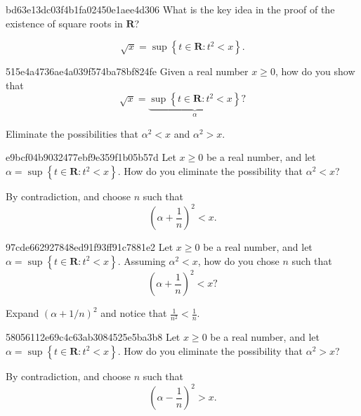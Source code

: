 \begin{note}{bd63e13dc03f4b1fa02450e1aee4d306}
    What is the key idea in the proof of the existence of square roots in \({ \mathbf{R} }\)?

    \begin{cloze}{1}
        \[
            \sqrt{x} = \sup \left\{ t \in \mathbf{R} : t^2 < x \right\}.
        \]
    \end{cloze}
\end{note}

\begin{note}{515e4a4736ae4a039f574ba78bf824fe}
    Given a real number \({ x \geq 0 }\), how do you show that
    \[
        \sqrt{x} = \underbrace{\sup \left\{ t \in \mathbf{R} : t^2 < x \right\}}_{\alpha}?
    \]

    \begin{cloze}{1}
        Eliminate the possibilities that \({ \alpha^2 < x }\) and \({ \alpha^2 > x }\).
    \end{cloze}
\end{note}

\begin{note}{e9bcf04b9032477ebf9e359f1b05b57d}
    Let \({ x \geq 0 }\) be a real number, and let \({ \alpha = \sup \left\{ t \in \mathbf{R} : t^2 < x \right\} }\).
    How do you eliminate the possibility that \({ \alpha^2 < x }\)?

    \begin{cloze}{1}
        By contradiction, and choose \({ n }\) such that
        \[
            \left( \alpha + \frac{1}{n} \right)^2 < x.
        \]
    \end{cloze}
\end{note}

\begin{note}{97cde662927848ed91f93ff91c7881e2}
    Let \({ x \geq 0 }\) be a real number, and let \({ \alpha = \sup \left\{ t \in \mathbf{R} : t^2 < x \right\} }\).
    Assuming \({ \alpha^2 < x }\), how do you chose \({ n }\) such that
    \[
            \left( \alpha + \frac{1}{n} \right)^2 < x?
    \]

    \begin{cloze}{1}
        Expand \({ \left( \alpha + 1/n \right)^2 }\) and notice that \({ \frac{1}{n^2} < \frac{1}{n} }\).
    \end{cloze}
\end{note}

\begin{note}{58056112e69c4c63ab3084525e5ba3b8}
    Let \({ x \geq 0 }\) be a real number, and let \({ \alpha = \sup \left\{ t \in \mathbf{R} : t^2 < x \right\} }\).
    How do you eliminate the possibility that \({ \alpha^2 > x }\)?

    \begin{cloze}{1}
        By contradiction, and choose \({ n }\) such that
        \[
            \left( \alpha - \frac{1}{n} \right)^2 > x.
        \]
    \end{cloze}
\end{note}

